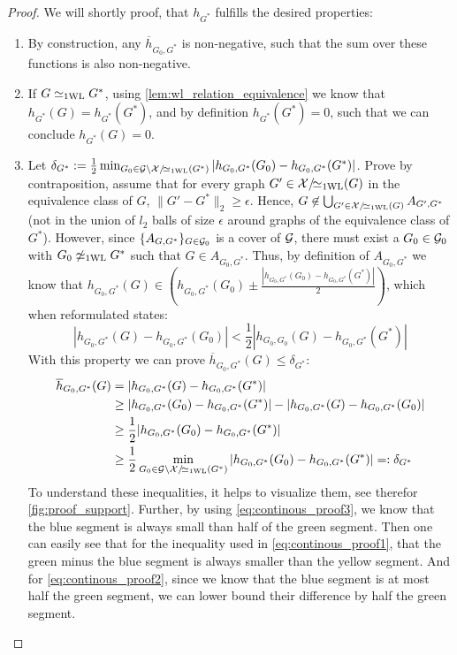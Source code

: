 \begin{proof}
    We will shortly proof, that $h_{G^*}$ fulfills the desired properties:
    \begin{enumerate}
        \item By construction, any $\overline{h}_{G_0, G^*}$ is non-negative, such that the sum over these functions is also non-negative.
        \item If $G \simeq_{\text{1WL}} G^*$, using \cref{lem:wl_relation_equivalence} we know that $h_{G^*}(G) = h_{G^*}(G^*)$, and by definition $h_{G^*}(G^*) = 0$, such that we can conclude $h_{G^*}(G)=0$.
        \item Let $\delta_{G^*} := \frac{1}{2} \min_{G_0 \in \mathcal{G} \setminus \mathcal{X}/\!{\simeq_{\text{1WL}}}(G^*)} |h_{G_0, G^*}(G_0) - h_{G_0, G^*}(G^*)|$. Prove by contraposition,  assume that for every graph $G' \in \mathcal{X}/\!{\simeq_{\text{1WL}}}(G)$ in the equivalence class of $G$, $\| G' - G^* \|_2 \geq \epsilon$. Hence, $G \not\in \bigcup_{G' \in \mathcal{X}/\!{\simeq_{\text{1WL}}}(G)} A_{G', G^*}$ (not in the union of $l_2$ balls of size $\epsilon$ around graphs of the equivalence class of $G^*$). However, since $\{ A_{G, G^*} \}_{G \in \mathcal{G}_0}$ is a cover of $\mathcal{G}$, there must exist a $G_0 \in \mathcal{G}_0$ with $G_0 \not\simeq_{\text{1WL}} G^*$ such that $G \in A_{G_0, G^*}$. Thus, by definition of $A_{G_0, G^*}$ we know that $h_{G_0, G^*}(G) \in (h_{G_0, G^*}(G_0) \pm \frac{|h_{G_0, G^*}(G_0) - h_{G_0, G^*}(G^*)|}{2})$, which when reformulated states:
        \begin{equation}\label{eq:continous_proof3}
             |h_{G_0, G^*}(G) - h_{G_0, G^*}(G_0)| < \frac{1}{2}|h_{G_0, G_0}(G) - h_{G_0, G^*}(G^*)|
        \end{equation}
        With this property we can prove $\overline{h}_{G_0, G^*}(G) \leq \delta_{G^*}$:
        \begin{align}
            \overline{h}_{G_0, G^*}(G) &= |h_{G_0, G^*}(G) - h_{G_0, G^*}(G^*)| \nonumber \\
            &\geq |h_{G_0, G^*}(G_0) - h_{G_0, G^*}(G^*)| - |h_{G_0, G^*}(G) - h_{G_0, G^*}(G_0)|\label{eq:continous_proof1}\\
            &\geq \frac{1}{2} |h_{G_0, G^*}(G_0) - h_{G_0, G^*}(G^*)|\label{eq:continous_proof2}\\
            &\geq \frac{1}{2} \min_{G_0 \in \mathcal{G} \setminus \mathcal{X}/\!{\simeq_{\text{1WL}}}(G^*)} |h_{G_0, G^*}(G_0) - h_{G_0, G^*}(G^*)| =: \delta_{G^*} \nonumber
        \end{align}
        To understand these inequalities, it helps to visualize them, see therefor \autoref{fig:proof_support}. Further, by using \autoref{eq:continous_proof3}, we know that the blue segment is always small than half of the green segment. Then one can easily see that for the inequality used in \autoref{eq:continous_proof1}, that the green minus the blue segment is always smaller than the yellow segment. And for  \autoref{eq:continous_proof2}, since we know that the blue segment is at most half the green segment, we can lower bound their difference by half the green segment.


\end{enumerate}
\end{proof}
